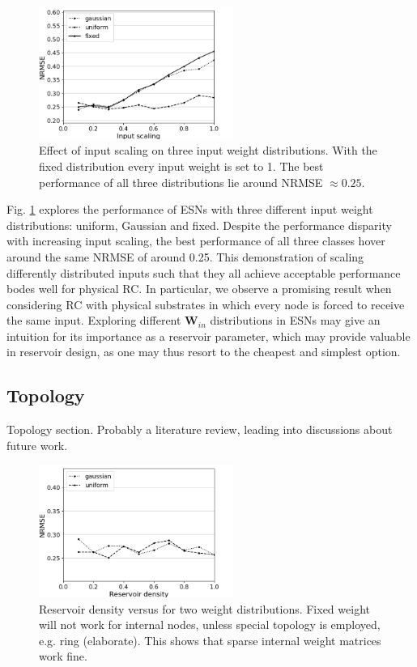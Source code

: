 \begin{figure}[H]
  \centering
  \includegraphics[width=2.5in]{img/input_scaling_distrib.png}
  \caption{
    Effect of input scaling on three input weight distributions. With the fixed
distribution every input weight is set to 1. The best performance of all three
distributions lie around NRMSE $\approx 0.25$.
  }
  \label{input_scaling_distrib}
\end{figure}

Fig. \ref{input_scaling_distrib} explores the performance of ESNs with three
different input weight distributions: uniform, Gaussian and fixed. Despite the
performance disparity with increasing input scaling, the best performance of all
three classes hover around the same NRMSE of around 0.25. This demonstration of
scaling differently distributed inputs such that they all achieve acceptable
performance bodes well for physical RC. In particular, we observe a promising
result when considering RC with physical substrates in which every node is
forced to receive the same input. Exploring different $\mathbf{W}_{in}$
distributions in ESNs may give an intuition for its importance as a reservoir
parameter, which may provide valuable in reservoir design, as one may thus
resort to the cheapest and simplest option.


\subsection{Topology}

Topology section. Probably a literature review, leading into discussions about
future work.

\begin{figure}[H]
  \centering
  \includegraphics[width=2.5in]{img/reservoir_density_distrib.png}
  \caption{
    Reservoir density versus for two weight distributions. Fixed weight will not
work for internal nodes, unless special topology is employed, e.g. ring
(elaborate). This shows that sparse internal weight matrices work fine.
  }
  \label{reservoir_density_distrib}
\end{figure}

